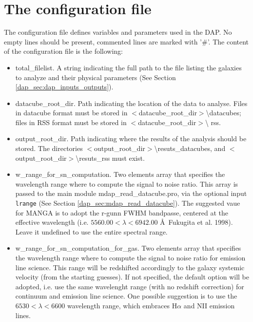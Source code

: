\section{The configuration file}
\label{dap_sec:configuration}

The configuration file defines variables and parameters used in the
DAP. No empty lines should be present, commented lines are marked with
'\#'. The content of the configuration file is the following:

\begin{itemize}

 \item total\_filelist. A string indicating the full path to the file
   listing the galaxies to analyze and their physical parameters (See
   Section \ref{dap_sec:dap_inputs_outputs}).

 \item datacube\_root\_dir. Path indicating the location of the data
   to analyse. Files in datacube format must be stored in
   $<$datacube\_root\_dir$>$\textbackslash datacubes; files in RSS
   format must be stored in $<$datacube\_root\_dir$>$\textbackslash
   rss.
 
 \item output\_root\_dir. Path indicating where the results of the
   analysis should be stored. The directories
   $<$output\_root\_dir$>$\textbackslash resuts\_datacubes, and
   $<$output\_root\_dir$>$\textbackslash resuts\_rss must exist.

 \item w\_range\_for\_sn\_computation. Two elements array that
   specifies the wavelength range where to compute the signal to noise
   ratio. This array is passed to the main module
   mdap\_read\_datacube.pro, via the optional input {\tt lrange} (See
   Section \ref{dap_sec:mdap_read_datacube}). The suggested vaue for
   MANGA is to adopt the r-gunn FWHM bandpasse, centered at the
   effective wavelength (i.e.  $5560.00 < \lambda < 6942.00$
   \AA\ Fukugita et al. 1998). Leave it undefined to use the entire
   spectral range.


 \item w\_range\_for\_sn\_computation\_for\_gas. Two elements array
   that specifies the wavelength range where to compute the signal to
   noise ratio for emission line science. This range will be
   redshifted accordingly to the galaxy systemic velocity (from the
   starting guesses). If not specified, the default option will be
   adopted, i.e. use the same wavelenght range (with no redshift
   correction) for continuum and emission line science. One possible
   suggestion is to use the $6530 < \lambda <6600$ wavelength range,
   which embraces H$\alpha$ and NII emission lines.


\end{itemize}
